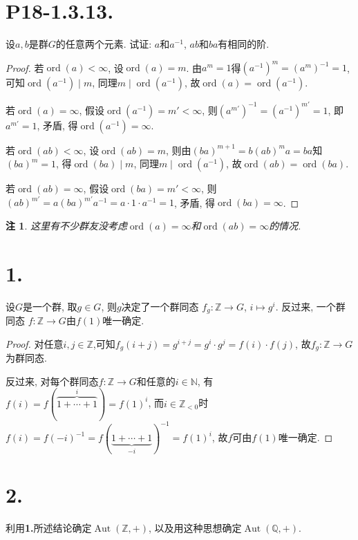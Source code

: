 \documentclass[12pt, a4paper, fontset=windows]{ctexart}
\newcommand{\N}{\mathbb{N}}
\newcommand{\Q}{\mathbb{Q}}
\newcommand{\Z}{\mathbb{Z}}
\newcommand{\Aut}{\operatorname{Aut}}
\newcommand{\ord}{\operatorname{ord}}
\newtheorem*{remark}{注}
\begin{document}
\section*{P18-1.3.13.}

设$a,b$是群$G$的任意两个元素. 试证: $a$和$a^{-1}$, $ab$和$ba$有相同的阶. 

\begin{proof}
若$\ord(a)<\infty$, 设$\ord(a)=m$. 由$a^m=1$得$(a^{-1})^m=(a^m)^{-1}=1$, 
可知$\ord(a^{-1})\mid m$, 同理$m\mid\ord(a^{-1})$, 
故$\ord(a)=\ord(a^{-1})$. 

若$\ord(a)=\infty$, 假设$\ord(a^{-1})=m'<\infty$, 
则$(a^{m'})^{-1}=(a^{-1})^{m'}=1$, 即$a^{m'}=1$, 矛盾, 得$\ord(a^{-1})=\infty$. 

\vspace{1em}

若$\ord(ab)<\infty$, 设$\ord(ab)=m$, 则由$(ba)^{m+1}=b(ab)^ma=ba$知$(ba)^m=1$, 
得$\ord(ba)\mid m$, 同理$m\mid\ord(a^{-1})$, 故$\ord(ab)=\ord(ba)$. 

若$\ord(ab)=\infty$, 假设$\ord(ba)=m'<\infty$, 
则$(ab)^{m'}=a(ba)^{m'}a^{-1}=a\cdot 1\cdot a^{-1}=1$, 矛盾, 得$\ord(ba)=\infty$. 
\end{proof}

\begin{remark}
这里有不少群友没考虑$\ord(a)=\infty$和$\ord(ab)=\infty$的情况. 
\end{remark}

\section*{1.}
\label{f-with-f(1)}

设$G$是一个群, 取$g\in G$, 则$g$决定了一个群同态
$f_g:\Z\to G$, $i\mapsto g^i$. 反过来, 一个群同态
$f:\Z\to G$由$f(1)$唯一确定. 

\begin{proof}
对任意$i,j\in\Z$,可知$f_g(i+j)=g^{i+j}=g^i\cdot g^j=f(i)\cdot f(j)$, 
故$f_g:\Z\to G$为群同态. 

反过来, 对每个群同态$f:\Z\to G$和任意的$i\in\N$, 
有$f(i)=f(\overbrace{1+\cdots+1}^i)=f(1)^i$, 而$i\in\Z_{<0}$时
$f(i)=f(-i)^{-1}=f(\underbrace{1+\cdots+1}_{-i})^{-1}=f(1)^i$, 
故$f$可由$f(1)$唯一确定. 
\end{proof}

\section*{2.}

利用{\bf 1.}所述结论确定$\Aut(\Z,+)$, 以及用这种思想确定$\Aut(\Q,+)$. 
\end{document}
